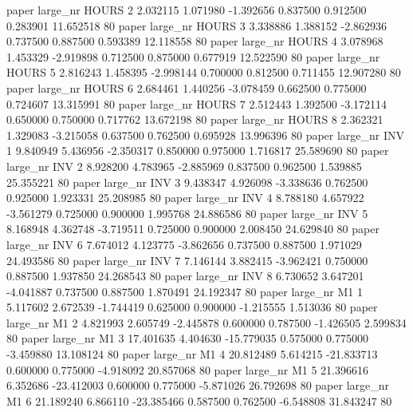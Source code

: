        paper   large_nr    HOURS                 2  2.032115  1.071980  -1.392656 0.837500 0.912500  0.283901   11.652518 80
       paper   large_nr    HOURS                 3  3.338886  1.388152  -2.862936 0.737500 0.887500  0.593389   12.118558 80
       paper   large_nr    HOURS                 4  3.078968  1.453329  -2.919898 0.712500 0.875000  0.677919   12.522590 80
       paper   large_nr    HOURS                 5  2.816243  1.458395  -2.998144 0.700000 0.812500  0.711455   12.907280 80
       paper   large_nr    HOURS                 6  2.684461  1.440256  -3.078459 0.662500 0.775000  0.724607   13.315991 80
       paper   large_nr    HOURS                 7  2.512443  1.392500  -3.172114 0.650000 0.750000  0.717762   13.672198 80
       paper   large_nr    HOURS                 8  2.362321  1.329083  -3.215058 0.637500 0.762500  0.695928   13.996396 80
       paper   large_nr      INV                 1  9.840949  5.436956  -2.350317 0.850000 0.975000  1.716817   25.589690 80
       paper   large_nr      INV                 2  8.928200  4.783965  -2.885969 0.837500 0.962500  1.539885   25.355221 80
       paper   large_nr      INV                 3  9.438347  4.926098  -3.338636 0.762500 0.925000  1.923331   25.208985 80
       paper   large_nr      INV                 4  8.788180  4.657922  -3.561279 0.725000 0.900000  1.995768   24.886586 80
       paper   large_nr      INV                 5  8.168948  4.362748  -3.719511 0.725000 0.900000  2.008450   24.629840 80
       paper   large_nr      INV                 6  7.674012  4.123775  -3.862656 0.737500 0.887500  1.971029   24.493586 80
       paper   large_nr      INV                 7  7.146144  3.882415  -3.962421 0.750000 0.887500  1.937850   24.268543 80
       paper   large_nr      INV                 8  6.730652  3.647201  -4.041887 0.737500 0.887500  1.870491   24.192347 80
       paper   large_nr       M1                 1  5.117602  2.672539  -1.744419 0.625000 0.900000 -1.215555    1.513036 80
       paper   large_nr       M1                 2  4.821993  2.605749  -2.445878 0.600000 0.787500 -1.426505    2.599834 80
       paper   large_nr       M1                 3 17.401635  4.404630 -15.779035 0.575000 0.775000 -3.459880   13.108124 80
       paper   large_nr       M1                 4 20.812489  5.614215 -21.833713 0.600000 0.775000 -4.918092   20.857068 80
       paper   large_nr       M1                 5 21.396616  6.352686 -23.412003 0.600000 0.775000 -5.871026   26.792698 80
       paper   large_nr       M1                 6 21.189240  6.866110 -23.385466 0.587500 0.762500 -6.548808   31.843247 80
